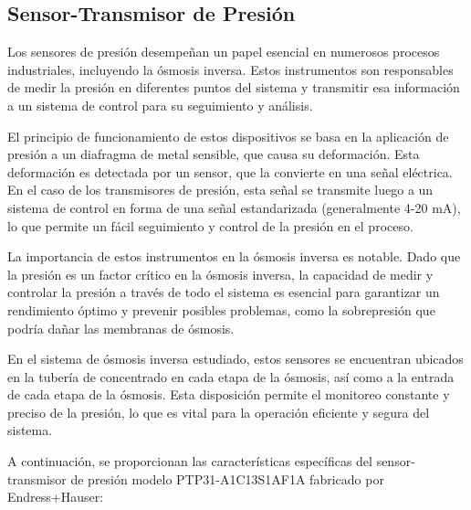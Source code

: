 \subsection{Sensor-Transmisor de Presión} \label{sec:sensor_presion}

Los sensores de presión desempeñan un papel esencial en numerosos procesos industriales,
incluyendo la ósmosis inversa. Estos instrumentos son responsables de medir la presión en diferentes puntos
del sistema y transmitir esa información a un sistema de control para su seguimiento y análisis.

El principio de funcionamiento de estos dispositivos se basa en la aplicación de presión a un diafragma de
metal sensible, que causa su deformación. Esta deformación es detectada por un sensor, que la convierte en
una señal eléctrica. En el caso de los transmisores de presión, esta señal se transmite luego a un sistema de control en forma
de una señal estandarizada (generalmente 4-20 mA), lo que permite un fácil seguimiento y control de la presión en el proceso.

La importancia de estos instrumentos en la ósmosis inversa es notable. Dado que la presión es un factor
crítico en la ósmosis inversa, la capacidad de medir y controlar la presión a través de todo el sistema
es esencial para garantizar un rendimiento óptimo y prevenir posibles problemas, como la sobrepresión
que podría dañar las membranas de ósmosis.

En el sistema de ósmosis inversa estudiado, estos sensores se encuentran
ubicados en la tubería de concentrado en cada etapa de la ósmosis, así como a la entrada de cada etapa
de la ósmosis. Esta disposición permite el monitoreo constante y preciso de la presión, lo que es
vital para la operación eficiente y segura del sistema.

A continuación, se proporcionan las características específicas del sensor-transmisor de presión
modelo PTP31-A1C13S1AF1A fabricado por Endress+Hauser:\\



